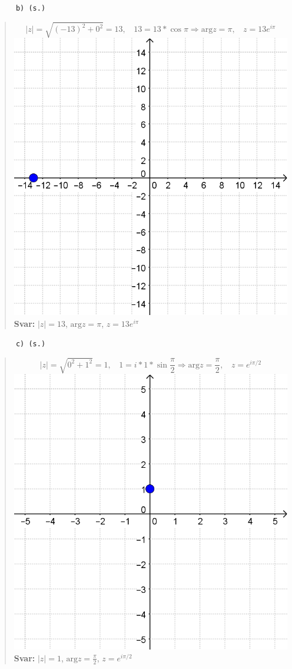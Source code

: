\documentclass[a4paper]{article}
\newcommand{\tskcol}[1]{\textcolor{tskcol}{#1}}
\begin{document}
	\texttt{\tskcol{~~~~~~b) (s.)}}
	\begin{quotation}
		\noindent
		\[|z|=\sqrt{(-13)^2+0^2}=13,~~~~ 13=13*\cos\pi \Rightarrow \text{arg}z=\pi,~~~~ z=13e^{i\pi}\]
		\includegraphics[scale=0.2]{images/619b.PNG}
		\\
		\textbf{Svar:} $|z|=13$, $\text{arg}z=\pi$, $z=13e^{i\pi}$
	\end{quotation}
	
	\texttt{\tskcol{~~~~~~c) (s.)}}
	\begin{quotation}
		\noindent
		\[|z|=\sqrt{0^2+1^2}=1,~~~~ 1=i*1*\sin\frac{\pi}{2} \Rightarrow \text{arg}z=\frac{\pi}{2},~~~~ z=e^{i\pi/2}\]
		\includegraphics[scale=0.2]{images/619c.PNG}
		\\
		\textbf{Svar:} $|z|=1$, $\text{arg}z=\frac{\pi}{2}$, $z=e^{i\pi/2}$
	\end{quotation}
	
\end{document}
